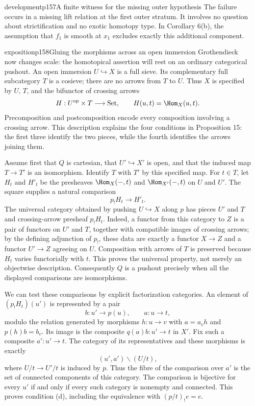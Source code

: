 \begin{dcomment}{development}{p157}{A finite witness for the missing outer hypothesis}
The failure occurs in a missing lift relation at the first outer stratum. It involves no question about strictification and no exotic homotopy type. In Corollary 6(b), the assumption that $f_1$ is smooth at $x_1$ excludes exactly this additional component.
\end{dcomment}

\begin{dcomment}{exposition}{p158}{Gluing the morphisms across an open immersion}
Grothendieck now changes scale: the homotopical assertion will rest on an ordinary categorical pushout. An open immersion $U\hookrightarrow X$ is a full sieve. Its complementary full subcategory $T$ is a cosieve; there are no arrows from $T$ to $U$. Thus $X$ is specified by $U$, $T$, and the bifunctor of crossing arrows
\[
       H:U^{\mathrm{op}}\times T\longrightarrow\mathrm{Set},
       \qquad H(u,t)=\Hom_X(u,t).
\]
Precomposition and postcomposition encode every composition involving a crossing arrow. This description explains the four conditions in Proposition 15: the first three identify the two pieces, while the fourth identifies the arrows joining them.

Assume first that $Q$ is cartesian, that $U'\hookrightarrow X'$ is open, and that the induced map $T\to T'$ is an isomorphism. Identify $T$ with $T'$ by this specified map. For $t\in T$, let $H_t$ and $H'_t$ be the presheaves $\Hom_X(-,t)$ and $\Hom_{X'}(-,t)$ on $U$ and $U'$. The square supplies a natural comparison
\[
                  p_!H_t\longrightarrow H'_t.
\]
The universal category obtained by pushing $U\hookrightarrow X$ along $p$ has pieces $U'$ and $T$ and crossing-arrow presheaf $p_!H_t$. Indeed, a functor from this category to $Z$ is a pair of functors on $U'$ and $T$, together with compatible images of crossing arrows; by the defining adjunction of $p_!$, these data are exactly a functor $X\to Z$ and a functor $U'\to Z$ agreeing on $U$. Composition with arrows of $T$ is preserved because $H_t$ varies functorially with $t$. This proves the universal property, not merely an objectwise description. Consequently $Q$ is a pushout precisely when all the displayed comparisons are isomorphisms.

We can test these comparisons by explicit factorization categories. An element of $(p_!H_t)(u')$ is represented by a pair
\[
       b:u'\longrightarrow p(u),\qquad a:u\longrightarrow t,
\]
modulo the relation generated by morphisms $h:u\to v$ with $a=a_vh$ and $p(h)b=b_v$. Its image is the composite $q(a)b:u'\to t$ in $X'$. Fix such a composite $a':u'\to t$. The category of its representatives and these morphisms is exactly
\[
        (u',a')\backslash(U/t),
\]
where $U/t\to U'/t$ is induced by $p$. Thus the fibre of the comparison over $a'$ is the set of connected components of this category. The comparison is bijective for every $u'$ if and only if every such category is nonempty and connected. This proves condition (d), including the equivalence with $(p/t)_!e=e$.


\end{dcomment}
